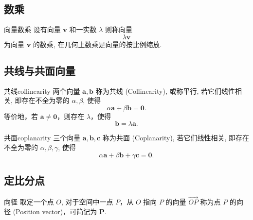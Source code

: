 \documentclass[cn,toc=twocol]{elegantbook}
\newcommand{\ve}[1]{\boldsymbol{#1}}
\newcommand{\Ve}[1]{\overrightarrow{#1}}
\begin{document}
\subsection{数乘}

\begin{definition}{向量数乘}
	设有向量 $\ve {v}$ 和一实数 $\lambda$ 则称向量
	\[
		\lambda\ve{v}
	\]
	为向量 $\ve {v}$ 的数乘, 在几何上数乘是向量的按比例缩放.
\end{definition}

\subsection{共线与共面向量}

\begin{definition}{共线}{collinearity}
	两个向量 $\ve a,\ve b$ 称为共线 (Collinearity), 或称平行, 若它们线性相关, 即存在不全为零的 $\alpha,\beta$, 使得  
    \[
    \alpha\ve a+\beta\ve b=\ve{0}.
    \]
    等价地，若 $\ve a\ne\ve{0}$，则存在 $\lambda$，使得  
    \[
    \ve b=\lambda\ve a.
    \]
\end{definition} 

\begin{definition}{共面}{coplanarity}
三个向量 $\ve a,\ve b,\ve c$ 称为共面 (Coplanarity), 若它们线性相关, 即存在不全为零的 $\alpha,\beta,\gamma$, 使得  
    \[
    \alpha\ve a + \beta\ve b + \gamma\ve c=\ve{0}.
    \]
\end{definition}


\subsection{定比分点}

\begin{definition}{向径}
取定一个点 $O$, 对于空间中一点 $P$，从 $O$ 指向 $P$ 的向量 $\Ve{OP}$ 称为点 $P$ 的向径 (Position vector)，可简记为 $\ve{P}$.
\end{definition}
	
\end{document}
